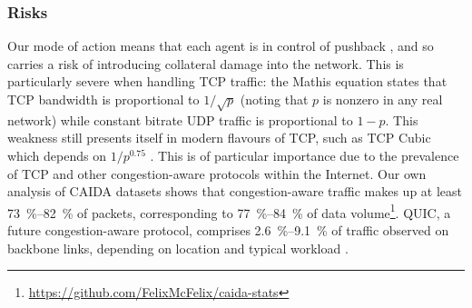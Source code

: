 \documentclass[10pt, times, comsoc]{IEEEtran}
\begin{document}
\subsubsection{Risks}
Our mode of action means that each agent is in control of pushback \cite{DBLP:journals/ccr/MahajanBFIPS02a}, and so carries a risk of introducing collateral damage into the network.
This is particularly severe when handling TCP traffic: the Mathis equation \cite{DBLP:journals/ccr/MathisSMO97} states that TCP bandwidth is proportional to $1/\sqrt{p}$ (noting that $p$ is nonzero in any real network) while constant bitrate UDP traffic is proportional to $1 - p$.
This weakness still presents itself in modern flavours of TCP, such as TCP Cubic which depends on $1/p^{0.75}$ \cite{rfc8312}.
This is of particular importance due to the prevalence of TCP and other congestion-aware protocols within the Internet.
Our own analysis of CAIDA datasets \cite{caida-2018-passive} shows that congestion-aware traffic makes up at least \SIrange{73}{82}{\percent} of packets, corresponding to \SIrange{77}{84}{\percent} of data volume\footnote{\url{https://github.com/FelixMcFelix/caida-stats}}.
QUIC, a future congestion-aware protocol, comprises \SIrange{2.6}{9.1}{\percent} of traffic observed on backbone links, depending on location and typical workload \cite{DBLP:conf/pam/RuthPDH18}.
\end{document}
